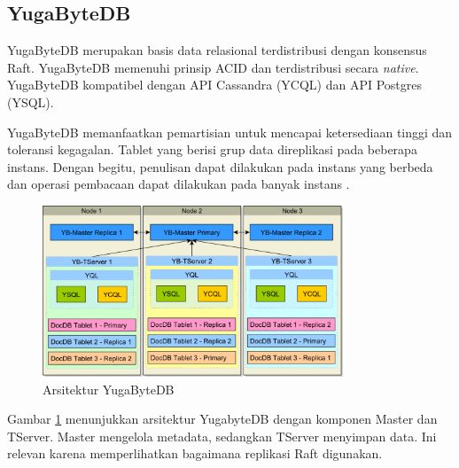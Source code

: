 \subsection{YugaByteDB}

YugaByteDB merupakan basis data relasional terdistribusi dengan konsensus Raft. YugaByteDB memenuhi prinsip ACID dan terdistribusi secara \textit{native}. YugaByteDB kompatibel dengan API Cassandra (YCQL) dan API Postgres (YSQL).

YugaByteDB memanfaatkan pemartisian untuk mencapai ketersediaan tinggi dan toleransi kegagalan. Tablet yang berisi grup data direplikasi pada beberapa instans. Dengan begitu, penulisan dapat dilakukan pada instans yang berbeda dan operasi pembacaan dapat dilakukan pada banyak instans \parencite{yugabyteBaeldung}.

\begin{figure}[H]
    \centering
    \includegraphics[width=0.8\textwidth]{resources/chapter-2/yugabyte.png}
    \caption{Arsitektur YugaByteDB \parencite{yugabyteBaeldung}}
    \label{fig:yugabyte-architecture}
\end{figure}

Gambar \ref{fig:yugabyte-architecture} menunjukkan arsitektur YugabyteDB dengan komponen Master dan TServer. Master mengelola metadata, sedangkan TServer menyimpan data. Ini relevan karena memperlihatkan bagaimana replikasi Raft digunakan.